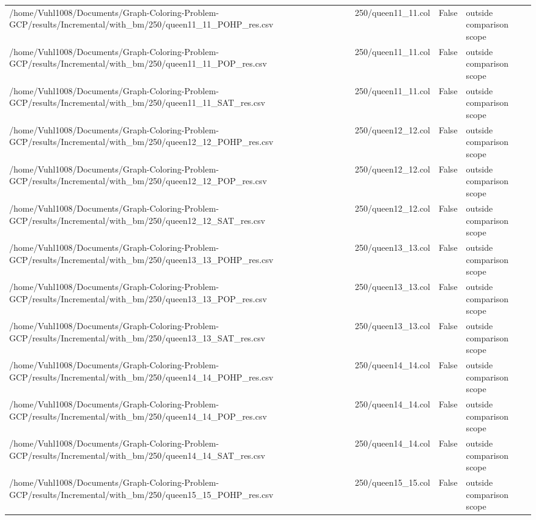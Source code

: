 \begin{table}[htbp]
\begin{tabular}{llll}
/home/Vuhl1008/Documents/Graph-Coloring-Problem-GCP/results/Incremental/with\_bm/250/queen11\_11\_POHP\_res.csv & 250/queen11\_11.col & False & outside comparison scope \\
/home/Vuhl1008/Documents/Graph-Coloring-Problem-GCP/results/Incremental/with\_bm/250/queen11\_11\_POP\_res.csv & 250/queen11\_11.col & False & outside comparison scope \\
/home/Vuhl1008/Documents/Graph-Coloring-Problem-GCP/results/Incremental/with\_bm/250/queen11\_11\_SAT\_res.csv & 250/queen11\_11.col & False & outside comparison scope \\
/home/Vuhl1008/Documents/Graph-Coloring-Problem-GCP/results/Incremental/with\_bm/250/queen12\_12\_POHP\_res.csv & 250/queen12\_12.col & False & outside comparison scope \\
/home/Vuhl1008/Documents/Graph-Coloring-Problem-GCP/results/Incremental/with\_bm/250/queen12\_12\_POP\_res.csv & 250/queen12\_12.col & False & outside comparison scope \\
/home/Vuhl1008/Documents/Graph-Coloring-Problem-GCP/results/Incremental/with\_bm/250/queen12\_12\_SAT\_res.csv & 250/queen12\_12.col & False & outside comparison scope \\
/home/Vuhl1008/Documents/Graph-Coloring-Problem-GCP/results/Incremental/with\_bm/250/queen13\_13\_POHP\_res.csv & 250/queen13\_13.col & False & outside comparison scope \\
/home/Vuhl1008/Documents/Graph-Coloring-Problem-GCP/results/Incremental/with\_bm/250/queen13\_13\_POP\_res.csv & 250/queen13\_13.col & False & outside comparison scope \\
/home/Vuhl1008/Documents/Graph-Coloring-Problem-GCP/results/Incremental/with\_bm/250/queen13\_13\_SAT\_res.csv & 250/queen13\_13.col & False & outside comparison scope \\
/home/Vuhl1008/Documents/Graph-Coloring-Problem-GCP/results/Incremental/with\_bm/250/queen14\_14\_POHP\_res.csv & 250/queen14\_14.col & False & outside comparison scope \\
/home/Vuhl1008/Documents/Graph-Coloring-Problem-GCP/results/Incremental/with\_bm/250/queen14\_14\_POP\_res.csv & 250/queen14\_14.col & False & outside comparison scope \\
/home/Vuhl1008/Documents/Graph-Coloring-Problem-GCP/results/Incremental/with\_bm/250/queen14\_14\_SAT\_res.csv & 250/queen14\_14.col & False & outside comparison scope \\
/home/Vuhl1008/Documents/Graph-Coloring-Problem-GCP/results/Incremental/with\_bm/250/queen15\_15\_POHP\_res.csv & 250/queen15\_15.col & False & outside comparison scope \\

\end{tabular}
\end{table}
